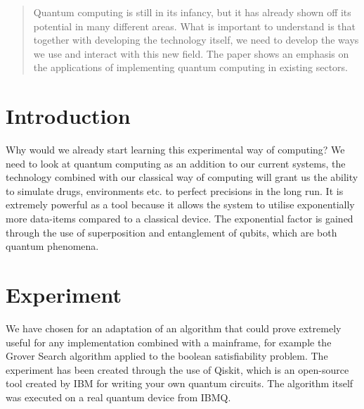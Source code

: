 \documentclass[a0,portrait]{a0poster}
\begin{document}
\begin{multicols}{2} %


\color{HoGentAccent1} %

\begin{abstract}
	Quantum computing is still in its infancy, but it has already shown off its potential in many different areas. What is important to understand is that together with developing the technology itself, we need to develop the ways we use and interact with this new field. The paper shows an emphasis on the applications of implementing quantum computing in existing sectors. 
\end{abstract}

\color{HoGentAccent1} 
\section*{Introduction}
\color{black}
\color{black}
Why would we already start learning this experimental way of computing? We need to look at quantum computing as an addition to our current systems, the technology combined with our classical way of computing will grant us the ability to simulate drugs, environments etc. to perfect precisions in the long run. It is extremely powerful as a tool because it allows the system to utilise exponentially more data-items compared to a classical device. The exponential factor is gained through the use of superposition and entanglement of qubits, which are both quantum phenomena.

\color{Black} %
\color{HoGentAccent1} 
\section*{Experiment}
\color{black}
We have chosen for an adaptation of an algorithm that could prove extremely useful for
any implementation combined with a mainframe, for example the Grover Search algorithm
applied to the boolean satisfiability problem. The experiment has been created through the use of Qiskit, which is an open-source tool created by IBM for writing your own quantum circuits. The algorithm itself was executed on a real quantum device from IBMQ.


\end{multicols}
\end{document}
